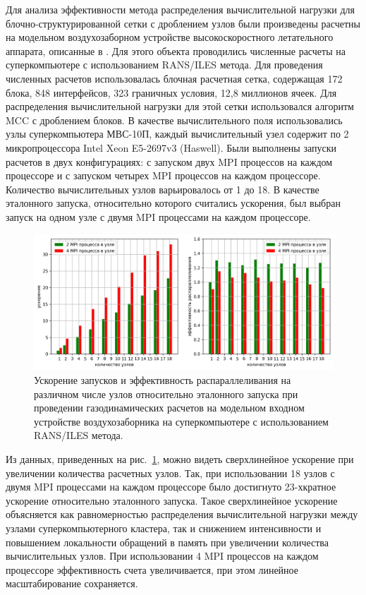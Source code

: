 Для анализа эффективности метода распределения вычислительной нагрузки для блочно-структурированной сетки с дроблением узлов были произведены расчетны на модельном воздухозаборном устройстве высокоскоростного летательного аппарата, описанные в \cite{Bendersky2017Eff}.
Для этого объекта проводились численные расчеты на суперкомпьютере с использованием RANS/ILES метода.
Для проведения численных расчетов использовалась блочная расчетная сетка, содержащая 172 блока, 848 интерфейсов, 323 граничных условия, 12,8 миллионов ячеек.
Для распределения вычислительной нагрузки для этой сетки использовался алгоритм MCC с дроблением блоков.
В качестве вычислительного поля использовались узлы суперкомпьютера МВС-10П, каждый вычислительный узел содержит по 2 микропроцессора Intel Xeon E5-2697v3 (Haswell).
Были выполнены запуски расчетов в двух конфигурациях: с запуском двух MPI процессов на каждом процессоре и с запуском четырех MPI процессов на каждом процессоре.
Количество вычислительных узлов варьировалось от 1 до 18.
В качестве эталонного запуска, относительно которого считались ускорения, был выбран запуск на одном узле с двумя MPI процессами на каждом процессоре. 

\begin{figure}[ht]
\centering
\includegraphics[width=1.0\textwidth]{./pics/text_2_withcut/scaling2.png}
\singlespacing
{}\caption{Ускорение запусков и эффективность распараллеливания на различном числе узлов относительно эталонного запуска при проведении газодинамических расчетов на модельном входном устройстве воздухозаборника на суперкомпьютере с использованием RANS/ILES метода.}
\label{fig:text_2_withcut_scaling2}
\end{figure}

Из данных, приведенных на рис.~\ref{fig:text_2_withcut_scaling2}, можно видеть сверхлинейное ускорение при увеличении количества расчетных узлов.
Так, при использовании 18 узлов с двумя MPI процессами на каждом процессоре было достигнуто 23-хкратное ускорение относительно эталонного запуска.
Такое сверхлинейное ускорение объясняется как равномерностью распределения вычислительной нагрузки между узлами суперкомпьютерного кластера, так и снижением интенсивности и повышением локальности обращений в память при увеличении количества вычислительных узлов.
При использовании 4 MPI процессов на каждом процессоре эффективность счета увеличивается, при этом линейное масштабирование сохраняется.

